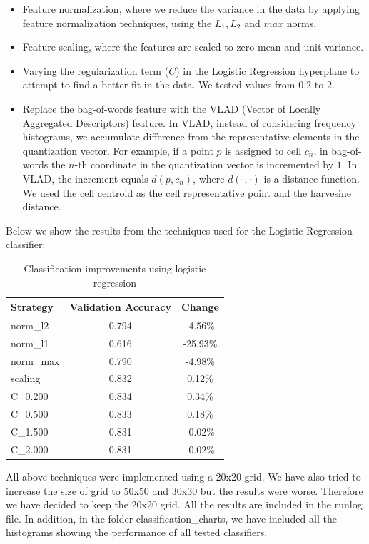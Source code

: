 \documentclass[12pt]{article}
\begin{document}
\begin{itemize}
	\item Feature normalization, where we reduce the variance in the data by
	applying feature normalization techniques, using the $L_1, L_2$ and $max$ norms.
	\item Feature scaling, where the features are scaled to zero mean and unit variance.
	\item Varying the regularization term ($C$) in the Logistic Regression hyperplane
	to attempt to find a better fit in the data. We tested values from $0.2$ to $2$.
	\item Replace the bag-of-words feature with the VLAD (Vector of Locally
	Aggregated Descriptors) feature. In VLAD,
	instead of considering frequency histograms, we accumulate difference
	from the representative elements in the quantization vector. For example,
	if a point $p$ is assigned to cell $c_n$, in bag-of-words the $n$-th
	coordinate in the quantization vector is incremented by $1$. In VLAD, the
	increment equals $d(p,c_n)$, where $d(\cdot,\cdot)$ is a distance function.
	We used the cell centroid as the cell representative point and the
	harvesine distance. 
\end{itemize}

Below we show the results from the techniques used for the Logistic Regression classifier:

\begin{table}[H]
	\centering
	\begin{tabular}{|l|c|c|}
		\hline
		\textbf{Strategy} & \textbf{Validation Accuracy} & \textbf{Change} \\ \hline
		norm\_l2 &  0.794  &  -4.56\%  \\ \hline
		norm\_l1 &  0.616  &  -25.93\%  \\ \hline
		norm\_max &  0.790  &  -4.98\%  \\ \hline
		scaling &  0.832  &  0.12\%  \\ \hline
		C\_0.200 &  0.834  &  0.34\%  \\ \hline
		C\_0.500 &  0.833  &  0.18\%  \\ \hline
		C\_1.500 &  0.831  &  -0.02\%  \\ \hline
		C\_2.000 &  0.831  &  -0.02\%  \\ \hline
	\end{tabular}
	\label{impr2}
	\caption{Classification improvements using logistic regression}
\end{table}

All above techniques were implemented using a 20x20 grid. We have also tried to increase the size of grid to 50x50 and 30x30 but the results were worse. Therefore we have decided to keep the 20x20 grid. All the results are included in the runlog file. In addition, in the folder classification\_charts, we have included all the histograms  showing the performance of all tested classifiers.
\end{document}
